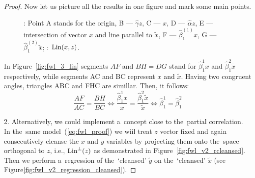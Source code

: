 \begin{proof}
Now let us picture all the results in one figure and mark some main points.

\begin{figure}[ht!]
\begin{center}
\hspace{4ex}
\caption{: Point A stands for the origin, B — $\hat\gamma z$,
C — $x$, D — $\hat\alpha z$, E — intersection of vector $x$ and line parallel to $\tilde x$,
F — $\hat\beta_1^{(1)} x$, G — $\hat\beta_1^{(2)} \tilde{x}$; : $\operatorname{Lin}(x,z)$.}
\end{center}
\end{figure}

In Figure~\ref{fig:fwl_3_lin} segments $AF$ and $BH = DG$ stand for $\hat\beta_1^{1}x$
and $\hat\beta_1^{2}\tilde x$ respectively, while segments AC and BC represent $x$ and $\tilde{x}$.
Having two congruent angles, triangles ABC and FHC are simillar.
Then, it follows:
\[
\frac{AF}{AC} = \frac{BH}{BC} \Leftrightarrow \frac{\hat\beta_1^{1}x}{x} = \frac{\hat\beta_1^{2}\tilde x}{\tilde x} \Leftrightarrow \hat\beta_1^{1} = \hat\beta_1^{2}
\]

2. Alternatively, we could implement a~concept close to the~partial correlation.
In the~same model~(\ref{eq:fwl_proof}) we wiil treat $z$ vector fixed and again
consecutively cleanse the $x$ and $y$ variables by projecting them onto
the~space orthogonal to $z$, i.e., $\operatorname{Lin}^\perp(z)$ as demonstrated in Figure~\ref{fig:fwl_v2_rcleansed}.
Then we perform a~regression of the~`cleansed' $\tilde y$ on the~`cleansed' $\tilde x$
(see Figure\ref{fig:fwl_v2_regression_cleansed}).


\end{proof}
